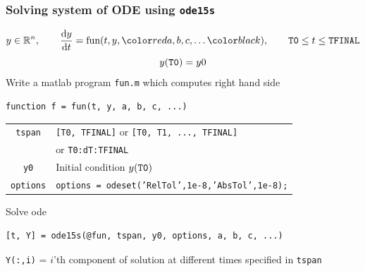 \documentclass[11pt,xcolor=svgnames,onlymath]{beamer}
\begin{document}
\begin{frame}
\frametitle{Solving system of ODE using {\tt ode15s}}
\[
y \in \re^n, \qquad \dd{y}{t} = \mbox{fun}(t, y, \clr{red}{a, b, c, \ldots}), \qquad {\tt T0} \le t \le {\tt TFINAL}
\]
\[
y({\tt T0}) = y0
\]
Write a matlab program {\tt fun.m} which computes right hand side
\begin{lstlisting}
function f = fun(t, y, a, b, c, ...)
\end{lstlisting}
\begin{center}
\begin{tabular}{|c|l|}
\hline
{\tt tspan} & {\tt [T0, TFINAL]} or {\tt [T0, T1, ..., TFINAL]} \\
& or {\tt T0:dT:TFINAL} \\
\hline
{\tt y0} & Initial condition $y({\tt T0})$ \\
\hline
{\tt options} &  {\tt options = odeset('RelTol',1e-8,'AbsTol',1e-8);} \\
\hline
\end{tabular}
\end{center}

Solve ode
\begin{lstlisting}
[t, Y] = ode15s(@fun, tspan, y0, options, a, b, c, ...)
\end{lstlisting}

\begin{center}
{\tt Y(:,i)} = $i$'th component of solution at different times specified in {\tt tspan}
\end{center}

\end{frame}
\end{document}
